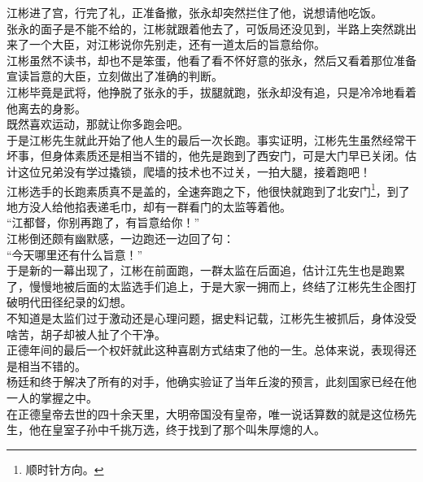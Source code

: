 \begin{multicols}{\theparacolNo}
江彬进了宫，行完了礼，正准备撤，张永却突然拦住了他，说想请他吃饭。\\

张永的面子是不能不给的，江彬就跟着他去了，可饭局还没见到，半路上突然跳出来了一个大臣，对江彬说你先别走，还有一道太后的旨意给你。\\

江彬虽然不读书，却也不是笨蛋，他看了看不怀好意的张永，然后又看着那位准备宣读旨意的大臣，立刻做出了准确的判断。\\

江彬毕竟是武将，他挣脱了张永的手，拔腿就跑，张永却没有追，只是冷冷地看着他离去的身影。\\

既然喜欢运动，那就让你多跑会吧。\\

于是江彬先生就此开始了他人生的最后一次长跑。事实证明，江彬先生虽然经常干坏事，但身体素质还是相当不错的，他先是跑到了西安门，可是大门早已关闭。估计这位兄弟没有学过撬锁，爬墙的技术也不过关，一拍大腿，接着跑吧！\\

江彬选手的长跑素质真不是盖的，全速奔跑之下，他很快就跑到了北安门\footnote{顺时针方向。}，到了地方没人给他掐表递毛巾，却有一群看门的太监等着他。\\

“江都督，你别再跑了，有旨意给你！”\\

江彬倒还颇有幽默感，一边跑还一边回了句：\\

“今天哪里还有什么旨意！”\\

于是新的一幕出现了，江彬在前面跑，一群太监在后面追，估计江先生也是跑累了，慢慢地被后面的太监选手们追上，于是大家一拥而上，终结了江彬先生企图打破明代田径纪录的幻想。\\

不知道是太监们过于激动还是心理问题，据史料记载，江彬先生被抓后，身体没受啥苦，胡子却被人扯了个干净。\\

正德年间的最后一个权奸就此这种喜剧方式结束了他的一生。总体来说，表现得还是相当不错的。\\

杨廷和终于解决了所有的对手，他确实验证了当年丘浚的预言，此刻国家已经在他一人的掌握之中。\\

在正德皇帝去世的四十余天里，大明帝国没有皇帝，唯一说话算数的就是这位杨先生，他在皇室子孙中千挑万选，终于找到了那个叫朱厚熜的人。\\


\end{multicols}
